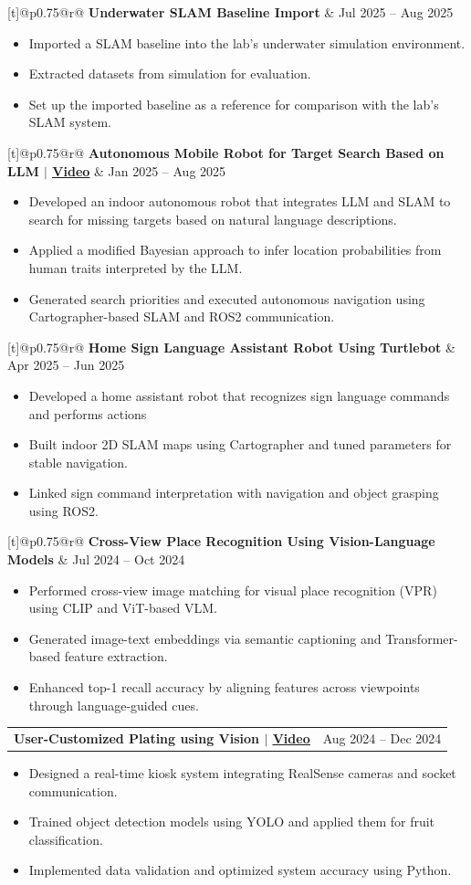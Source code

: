 \documentclass[a4paper,11pt]{article}
\makeatletter
\newcommand{\resumeItem}[1]{
  \item\small{
    {#1 \vspace{-2pt}}
  }
}
\newcommand{\resumeProjectHeading}[2]{
    \item
    \begin{tabular*}{\linewidth}[t]{@{}p{0.75\textwidth}@{\extracolsep{\fill}}r@{}}
      \textbf{#1} & \small #2 \\
    \end{tabular*}\vspace{-5pt}
}
\newcommand{\resumeItemListStart}{\begin{itemize}[leftmargin=0.3in, label={$\bullet$}, labelsep=0.5em, itemsep=4pt]} %
\newcommand{\resumeItemListEnd}{\end{itemize}\vspace{-5pt}}
\makeatother
\begin{document}
    \resumeProjectHeading
      {Underwater SLAM Baseline Import}{Jul 2025 -- Aug 2025}
      \resumeItemListStart
        \resumeItem{Imported a SLAM baseline into the lab’s underwater simulation environment.}
        \resumeItem{Extracted datasets from simulation for evaluation.}
        \resumeItem{Set up the imported baseline as a reference for comparison with the lab’s SLAM system.}
      \resumeItemListEnd

    \resumeProjectHeading
      {Autonomous Mobile Robot for Target Search Based on LLM $|$ \href{https://youtu.be/Bqs7iYU-Kjk?si=7gQSTB2MeHtVfMld}{\underline{Video}}}{Jan 2025 -- Aug 2025}
      \resumeItemListStart
        \normalsize{\textbf{[Team Leader]}}
        \resumeItem{Developed an indoor autonomous robot that integrates LLM and SLAM to search for missing targets based on natural language descriptions.}
        \resumeItem{Applied a modified Bayesian approach to infer location probabilities from human traits interpreted by the LLM.}
        \resumeItem{Generated search priorities and executed autonomous navigation using Cartographer-based SLAM and ROS2 communication.}
      \resumeItemListEnd

    \resumeProjectHeading
      {Home Sign Language Assistant Robot Using Turtlebot}{Apr 2025 -- Jun 2025}
      \resumeItemListStart
        \resumeItem{Developed a home assistant robot that recognizes sign language commands and performs actions}
        \resumeItem{Built indoor 2D SLAM maps using Cartographer and tuned parameters for stable navigation.}
        \resumeItem{Linked sign command interpretation with navigation and object grasping using ROS2.}
      \resumeItemListEnd

    \resumeProjectHeading
      {Cross-View Place Recognition Using Vision-Language Models}{Jul 2024 -- Oct 2024}
      \resumeItemListStart
        \resumeItem{Performed cross-view image matching for visual place recognition (VPR) using CLIP and ViT-based VLM.}
        \resumeItem{Generated image-text embeddings via semantic captioning and Transformer-based feature extraction.}
        \resumeItem{Enhanced top-1 recall accuracy by aligning features across viewpoints through language-guided cues.}
      \resumeItemListEnd

    \resumeProjectHeading
      {User-Customized Plating using Vision $|$ \href{https://youtu.be/ZHClhxUTSkU?si=HMK2aNz7yQusN9WC}{\underline{Video}}}{Aug 2024 -- Dec 2024}
      \resumeItemListStart
        \resumeItem{Designed a real-time kiosk system integrating RealSense cameras and socket communication.}
        \resumeItem{Trained object detection models using YOLO and applied them for fruit classification.}
        \resumeItem{Implemented data validation and optimized system accuracy using Python.}
      \resumeItemListEnd
\end{document}
